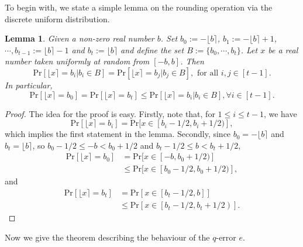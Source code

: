 \documentclass{cta-author}
\newtheorem{lemma}{Lemma}{}
\begin{document}
To begin with, we state a simple lemma on the rounding operation via the discrete uniform distribution.
\begin{lemma}\label{lem1}
	Given a non-zero real number $b$. Set $b_0:=-\lfloor b \rceil$, $b_1:=-\lfloor b \rceil+1$, $\cdots,b_{t-1}:=\lfloor b \rceil-1$ and $b_t:= \lfloor b \rceil $ and  define the set $B:=\{b_0, \cdots, b_t\}$. Let $x$ be a real number taken uniformly at random from $[-b, b]$. Then
	\begin{equation*}\label{eq5}
	\mathrm{Pr}[\lfloor x \rceil=b_i| b_i \in B]=\mathrm{Pr}[\lfloor x \rceil=b_j| b_j \in B], \text{ for all } i,j \in [t-1].
	\end{equation*}
	In particular,
	\begin{equation*}\label{eq6}
	\mathrm{Pr}[\lfloor x \rceil=b_0]=\mathrm{Pr}[\lfloor x \rceil=b_t]\leq \mathrm{Pr}[\lfloor x \rceil=b_i| b_i\in B], \forall i \in [t-1].
	\end{equation*}
\end{lemma} 

\begin{proof} The idea for the proof is easy. Firstly, note that, for $1 \leq i \leq t-1$, we have
	$$\mathrm{Pr}[\lfloor x \rceil=b_i]=\mathrm{Pr}[x \in [b_i-1/2, b_i+1/2)],$$
	which implies the first statement in the lemma.
	Secondly, since $b_0=-\lfloor b \rceil$ and $b_t=\lfloor b \rceil$, so $b_0-1/2 \leq -b < b_0+1/2$ and $b_t-1/2 \leq b < b_t+1/2$,
	\begin{align*}
	\mathrm{Pr}[\lfloor x \rceil=b_0]&=\mathrm{Pr}[x \in [-b, b_0+1/2)]\\& \leq \mathrm{Pr}[x \in [b_0-1/2, b_0+1/2)],
	\end{align*}
	and \begin{align*}
	\mathrm{Pr}[\lfloor x \rceil=b_t]&=\mathrm{Pr}[x \in [b_t-1/2, b]] \\&\leq \mathrm{Pr}[x \in \left[b_t-1/2, b_t+1/2 \right)].
	\end{align*}
	
\end{proof} 
Now we give the theorem describing the behaviour of the $q$-error $e$.
\end{document}
